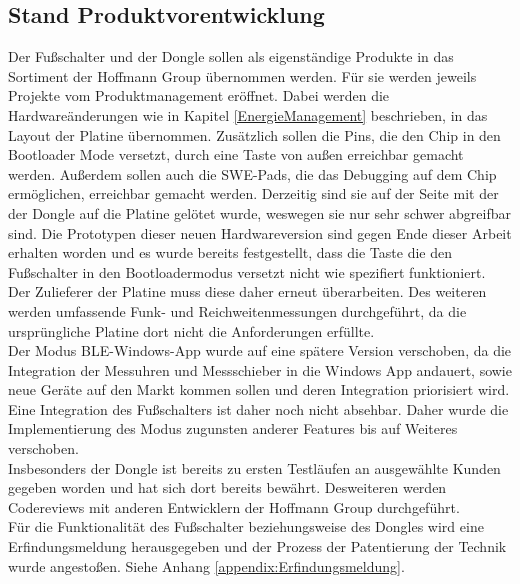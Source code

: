 \subsection{Stand Produktvorentwicklung}
Der Fußschalter und der Dongle sollen als eigenständige Produkte in das Sortiment der Hoffmann Group übernommen werden. Für sie werden jeweils Projekte vom Produktmanagement eröffnet. Dabei werden die Hardwareänderungen wie in Kapitel \ref{EnergieManagement} beschrieben, in das Layout der Platine übernommen. Zusätzlich sollen die Pins, die den Chip in den Bootloader Mode versetzt, durch eine Taste von außen erreichbar gemacht werden. Außerdem sollen auch die SWE-Pads, die das Debugging auf dem Chip ermöglichen, erreichbar gemacht werden. Derzeitig sind sie auf der Seite mit der der Dongle auf die Platine gelötet wurde, weswegen sie nur sehr schwer abgreifbar sind. Die Prototypen dieser neuen Hardwareversion sind gegen Ende dieser Arbeit erhalten worden und es wurde bereits festgestellt, dass die Taste die den Fußschalter in den Bootloadermodus versetzt nicht wie spezifiert funktioniert. Der Zulieferer der Platine muss diese daher erneut überarbeiten. Des weiteren werden umfassende Funk- und Reichweitenmessungen durchgeführt, da die ursprüngliche Platine dort nicht die Anforderungen erfüllte.\\
Der Modus \ac{BLE}-Windows-App wurde auf eine spätere Version verschoben, da die Integration der Messuhren und Messschieber in die Windows App andauert, sowie neue Geräte auf den Markt kommen sollen und deren Integration priorisiert wird. Eine Integration des Fußschalters ist daher noch nicht absehbar. Daher wurde die Implementierung des Modus zugunsten anderer Features bis auf Weiteres verschoben.\\
Insbesonders der Dongle ist bereits zu ersten Testläufen an ausgewählte Kunden gegeben worden und hat sich dort bereits bewährt. Desweiteren werden Codereviews mit anderen Entwicklern der Hoffmann Group durchgeführt.\\
Für die Funktionalität des Fußschalter beziehungsweise des Dongles wird eine Erfindungsmeldung herausgegeben und der Prozess der Patentierung der Technik wurde angestoßen. Siehe Anhang \ref{appendix:Erfindungsmeldung}.
